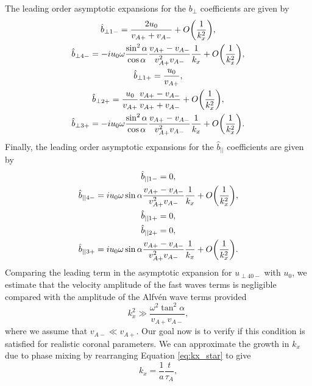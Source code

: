 The leading order asymptotic expansions for the $b_\perp$ coefficients are given by
\begin{gather}
    \hat{b}_{\perp 1-} = \frac{2u_0}{v_{A+}+v_{A-}} + O\qty(\frac{1}{k_x^2}), \\
    \hat{b}_{\perp 4-} = -iu_0\omega\frac{\sin^2\alpha}{\cos\alpha}\frac{v_{A+}-v_{A-}}{v_{A+}^2v_{A-}}\frac{1}{k_x} + O\qty(\frac{1}{k_x^2}), \\
    \hat{b}_{\perp 1+} = \frac{u_0}{v_{A+}}, \\
    \hat{b}_{\perp 2+} = \frac{u_0}{v_{A+}}\frac{v_{A+}-v_{A-}}{v_{A+}+v_{A-}} + O\qty(\frac{1}{k_x^2}), \\
    \hat{b}_{\perp 3+} = -iu_0\omega\frac{\sin^2\alpha}{\cos\alpha}\frac{v_{A+}-v_{A-}}{v_{A+}^2v_{A-}}\frac{1}{k_x} + O\qty(\frac{1}{k_x^2}).
\end{gather}
Finally, the leading order asymptotic expansions for the $\hat{b}_{||}$ coefficients are given by
\begin{gather}
    \hat{b}_{|| 1-} = 0, \\
    \hat{b}_{|| 4-} = iu_0\omega\sin\alpha\frac{v_{A+}-v_{A-}}{v_{A+}^2v_{A-}}\frac{1}{k_x} + O\qty(\frac{1}{k_x^2}), \\
    \hat{b}_{|| 1+} = 0, \\
    \hat{b}_{|| 2+} = 0, \\
    \label{eq:oblique_field_uniform_in_x_b_par30+}
    \hat{b}_{|| 3+} = iu_0\omega\sin\alpha\frac{v_{A+}-v_{A-}}{v_{A+}^2v_{A-}}\frac{1}{k_x} + O\qty(\frac{1}{k_x^2}).
\end{gather}
Comparing the leading term in the asymptotic expansion for $u_{\perp40-}$ with $u_0$, we estimate that the velocity amplitude of the fast waves terms is negligible compared with the amplitude of the Alfv\'en wave terms provided
\begin{equation}
    \label{eq:chap_4_kx_condition}
    k_x^2 \gg \frac{\omega^2\tan^2\alpha}{v_{A+}v_{A-}},
\end{equation}
where we assume that $v_{A-}\ll v_{A+}$. Our goal now is to verify if this condition is satisfied for realistic coronal parameters. We can approximate the growth in $k_x$ due to phase mixing by rearranging Equation \eqref{eq:kx_star} to give
\begin{equation}
    \label{eq:kx_growth}
    k_x = \frac{1}{a}\frac{t}{\tau_A},
\end{equation}
